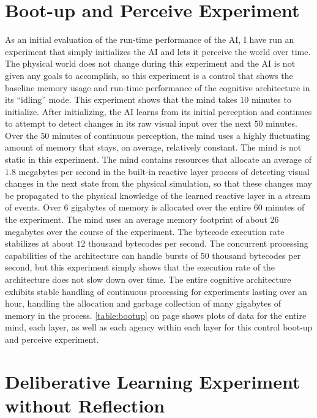 \section{Boot-up and Perceive Experiment}

As an initial evaluation of the run-time performance of the AI, I have
run an experiment that simply initializes the AI and lets it perceive
the world over time.  The physical world does not change during this
experiment and the AI is not given any goals to accomplish, so this
experiment is a control that shows the baseline memory usage and
run-time performance of the cognitive architecture in its ``idling''
mode.  This experiment shows that the mind takes $10$ minutes to
initialize.  After initializing, the AI learns from its initial
perception and continues to attempt to detect changes in its raw
visual input over the next $50$ minutes.  Over the $50$ minutes of
continuous perception, the mind uses a highly fluctuating amount of
memory that stays, on average, relatively constant.  The mind is not
static in this experiment.  The mind contains resources that allocate
an average of $1.8$ megabytes per second in the built-in reactive
layer process of detecting visual changes in the next state from the
physical simulation, so that these changes may be propagated to the
physical knowledge of the learned reactive layer in a stream of
events.  Over $6$ gigabytes of memory is allocated over the entire
$60$ minutes of the experiment.  The mind uses an average memory
footprint of about $26$ megabytes over the course of the experiment.
The bytecode execution rate stabilizes at about $12$ thousand
bytecodes per second.  The concurrent processing capabilities of the
architecture can handle bursts of $50$ thousand bytecodes per second,
but this experiment simply shows that the execution rate of the
architecture does not slow down over time.  The entire cognitive
architecture exhibits stable handling of continuous processing for
experiments lasting over an hour, handling the allocation and garbage
collection of many gigabytes of memory in the process.
\autoref{table:bootup} on page \pageref{table:bootup} shows plots of
data for the entire mind, each layer, as well as each agency within
each layer for this control boot-up and perceive experiment.

\section{Deliberative Learning Experiment without Reflection}

